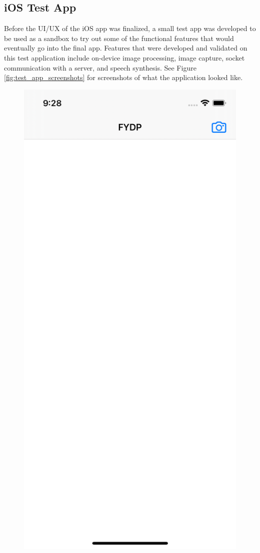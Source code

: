 \documentclass[a4paper,11pt]{article}
\begin{document}
\subsection{iOS Test App}
Before the UI/UX of the iOS app was finalized, a small test app was developed to be used as a sandbox to try out some of the functional features that would eventually go into the final app. Features that were developed and validated on this test application include on-device image processing, image capture, socket communication with a server, and speech synthesis. See Figure \ref{fig:test_app_screenshots} for screenshots of what the application looked like.

\begin{figure}[H]
\centering
\includegraphics[scale=0.1]{img/test_app/testapp_home.png}

\end{figure}
\end{document}

